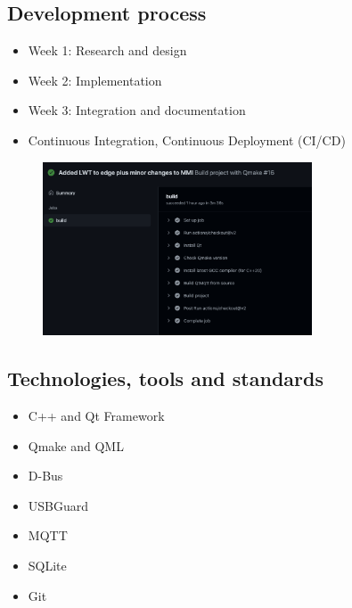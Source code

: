 \subsection{Development process}
\begin{frame}{\insertsubsection}
    \begin{itemize}
        \item Week 1: Research and design
        \item Week 2: Implementation
        \item Week 3: Integration and documentation
        \vspace{0.5cm}
        \item Continuous Integration, Continuous Deployment (CI/CD)
    \end{itemize}
    
    \begin{figure}[h]
        \centering
        \includegraphics[width=8cm]{img/pipeline.png}
        \label{fig:concept}
    \end{figure}
\end{frame}

\subsection{Technologies, tools and standards}
\begin{frame}{\insertsubsection}
    \begin{itemize}
        \item C++ and Qt Framework
        \item Qmake and QML
        \item D-Bus
        \item USBGuard
        \item MQTT
        \item SQLite
        \item Git
    \end{itemize}
\end{frame}


